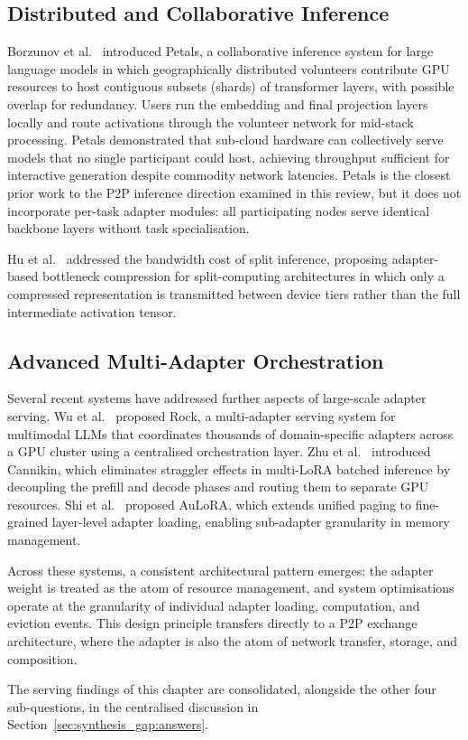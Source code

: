 \subsection{Distributed and Collaborative Inference}
\label{sec:inference_systems:distributed}

Borzunov et al.~\cite{Borzunov2023} introduced Petals, a collaborative inference system for large
language models in which geographically distributed volunteers contribute GPU
resources to host contiguous subsets (shards) of transformer layers, with possible overlap for redundancy. Users run the
embedding and final projection layers locally and route activations through the
volunteer network for mid-stack processing. Petals demonstrated that sub-cloud hardware
can collectively serve models that no single participant could host, achieving
throughput sufficient for interactive generation despite commodity network latencies.
Petals is the closest prior work to the P2P inference direction examined in this review,
but it does not incorporate per-task adapter modules: all participating nodes serve
identical backbone layers without task specialisation.

Hu et al.~\cite{HuDistributed2022} addressed the bandwidth cost of split inference, proposing
adapter-based bottleneck compression for split-computing architectures in which only
a compressed representation is transmitted between device tiers rather than the full
intermediate activation tensor.

\subsection{Advanced Multi-Adapter Orchestration}
\label{sec:inference_systems:advanced}

Several recent systems have addressed further aspects of large-scale adapter serving.
Wu et al.~\cite{WuRock2025} proposed Rock, a multi-adapter serving system for multimodal LLMs
that coordinates thousands of domain-specific adapters across a GPU cluster using a
centralised orchestration layer. Zhu et al.~\cite{ZhuCannikin2025} introduced Cannikin, which
eliminates straggler effects in multi-LoRA batched inference by decoupling the prefill
and decode phases and routing them to separate GPU resources. Shi et al.~\cite{Shi2025AuLoRA}
proposed AuLoRA, which extends unified paging to fine-grained layer-level adapter
loading, enabling sub-adapter granularity in memory management.

Across these systems, a consistent architectural pattern emerges: the adapter weight is
treated as the atom of resource management, and system optimisations operate at the
granularity of individual adapter loading, computation, and eviction events. This
design principle transfers directly to a P2P exchange architecture, where the adapter is also
the atom of network transfer, storage, and composition.

\noindent The serving findings of this chapter are consolidated, alongside the
other four sub-questions, in the centralised discussion in
Section~\ref{sec:synthesis_gap:answers}.

